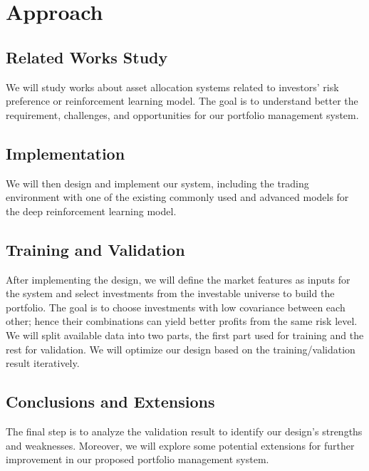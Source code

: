 \chapter{Approach}
\section{Related Works Study}
We will study works about asset allocation systems related to investors' risk preference or reinforcement learning model. The goal is to understand better the requirement, challenges, and opportunities for our portfolio management system.
\section{Implementation}
We will then design and implement our system, including the trading environment with one of the existing commonly used and advanced models for the deep reinforcement learning model. 
\section{Training and Validation}
After implementing the design, we will define the market features as inputs for the system and select investments from the investable universe to build the portfolio. The goal is to choose investments with low covariance between each other; hence their combinations can yield better profits from the same risk level. We will split available data into two parts, the first part used for training and the rest for validation. We will optimize our design based on the training/validation result iteratively.
\section{Conclusions and Extensions}
The final step is to analyze the validation result to identify our design's strengths and weaknesses. Moreover, we will explore some potential extensions for further improvement in our proposed portfolio management system.
